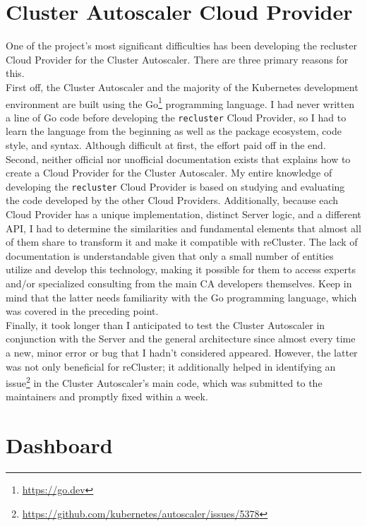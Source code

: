 \section{Cluster Autoscaler Cloud Provider}
\label{subsec:conclusions_limitations_and_future_works_cluster_autoscaler_cloud_provider}

One of the project's most significant difficulties has been developing the
recluster Cloud Provider for the Cluster Autoscaler. There are three primary reasons
for this. \\ %
First off, the Cluster Autoscaler and the majority of the Kubernetes development
environment are built using the Go\footnote{\url{https://go.dev}} programming
language. I had never written a line of Go code before developing the \texttt{recluster}
Cloud Provider, so I had to learn the language from the beginning as well as the
package ecosystem, code style, and syntax. Although difficult at first, the effort
paid off in the end. \\ %
Second, neither official nor unofficial documentation exists that explains how
to create a Cloud Provider for the Cluster Autoscaler. My entire knowledge of developing
the \texttt{recluster} Cloud Provider is based on studying and evaluating the
code developed by the other Cloud Providers. Additionally, because each Cloud
Provider has a unique implementation, distinct Server logic, and a different API,
I had to determine the similarities and fundamental elements that almost all of them
share to transform it and make it compatible with reCluster. The lack of
documentation is understandable given that only a small number of entities
utilize and develop this technology, making it possible for them to access experts
and/or specialized consulting from the main CA developers themselves. Keep in
mind that the latter needs familiarity with the Go programming language, which was
covered in the preceding point. \\ %
Finally, it took longer than I anticipated to test the Cluster Autoscaler in
conjunction with the Server and the general architecture since almost every time
a new, minor error or bug that I hadn't considered appeared. However, the latter
was not only beneficial for reCluster; it additionally helped in identifying an
issue\footnote{\url{https://github.com/kubernetes/autoscaler/issues/5378}} in
the Cluster Autoscaler's main code, which was submitted to the maintainers and promptly
fixed within a week.

\section{Dashboard}
\label{subsec:conclusions_limitations_and_future_works_dashboard}


